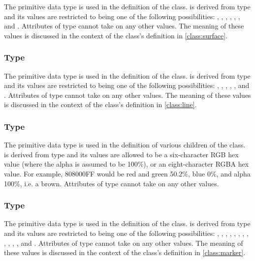 The  primitive data type is used in the definition of the \Surface class.   is derived from type  and its values are restricted to being one of the following possibilities: , , , , , , and .  Attributes of type  cannot take on any other values.  The meaning of these values is discussed in the context of the \Surface class's definition in \ref{class:surface}.

\subsubsection[\element{LineType}]{Type }
\label{type:lineType}

The  primitive data type is used in the definition of the \Line class.   is derived from type  and its values are restricted to being one of the following possibilities: , , , , , and .  Attributes of type  cannot take on any other values.  The meaning of these values is discussed in the context of the \Line class's definition in \ref{class:line}.

\subsubsection[\element{SedColor}]{Type }
\label{type:sedColor}

The  primitive data type is used in the definition of various children of the \Style class.   is derived from type  and its values are allowed to be a six-character RGB hex value (where the alpha is assumed to be 100\%), or an eight-character RGBA hex value.  For example, 808000FF would be red and green 50.2\%, blue 0\%, and alpha 100\%, i.e. a brown.  Attributes of type  cannot take on any other values.

\subsubsection[\element{MarkerType}]{Type }
\label{type:markerType}

The  primitive data type is used in the definition of the \Marker class.   is derived from type  and its values are restricted to being one of the following possibilities: , , , , , , , , , , , , and .  Attributes of type  cannot take on any other values.  The meaning of these values is discussed in the context of the \Marker class's definition in \ref{class:marker}.


